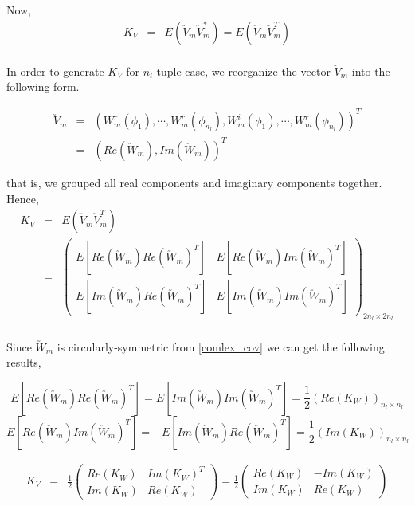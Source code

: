 	Now,
	\begin{eqnarray*}
		K_V & = & E(\utilde{V}_m\utilde{V}_m^*) = E(\utilde{V}_m\utilde{V}_m^T) \\
	\end{eqnarray*}
			
	In order to generate $K_V$ for $n_l$-tuple case, we reorganize the vector $\utilde{V}_m$ into the following form.
			
	\begin{eqnarray*}
		\utilde{V}_m  &=& (W_m^r(\phi_1),\cdots,W_m^r(\phi_{n_l}), W_m^i(\phi_1), \cdots, W_m^r(\phi_{n_l}))^T \\
		&=& (Re(\utilde{W}_m), Im(\utilde{W}_m))^T
	\end{eqnarray*}
			
	that is, we grouped all real components and imaginary components together. Hence,
	\begin{eqnarray*}
		K_V &=& E(\utilde{V}_m\utilde{V}_m^T) \\
		&=& \left(\begin{array}{ll}
		E[Re(\utilde{W}_m)Re(\utilde{W}_m)^T] &  E[Re(\utilde{W}_m)Im(\utilde{W}_m)^T] \\
		E[Im(\utilde{W}_m)Re(\utilde{W}_m)^T] &  E[Im(\utilde{W}_m)Im(\utilde{W}_m)^T]
		\end{array}
		\right)_{2n_{l}\times 2n_{l} } \\
	\end{eqnarray*}
			
	Since $\utilde{W}_m$ is circularly-symmetric from \ref{comlex_cov} we can get the following results,
			
	\[ E[Re(\utilde{W}_m)Re(\utilde{W}_m)^T] = E[Im(\utilde{W}_m)Im(\utilde{W}_m)^T] = \frac{1}{2}(Re(K_W))_{n_{l}\times n_{l}} \]
	\[ E[Re(\utilde{W}_m)Im(\utilde{W}_m)^T] = -E[Im(\utilde{W}_m)Re(\utilde{W}_m)^T] = \frac{1}{2}(Im(K_W))_{n_{l}\times n_{l}}\]
			
	\begin{eqnarray*}
		K_V&=& \frac{1}{2}\left( \begin{array}{ll}
		Re(K_W) & Im(K_W)^T \\
		Im(K_W) & Re(K_W)
		\end{array}
		\right) = \frac{1}{2}\left( \begin{array}{ll}
		Re(K_W) & -Im(K_W) \\
		Im(K_W) & Re(K_W)
		\end{array}
		\right)
	\end{eqnarray*}
		
